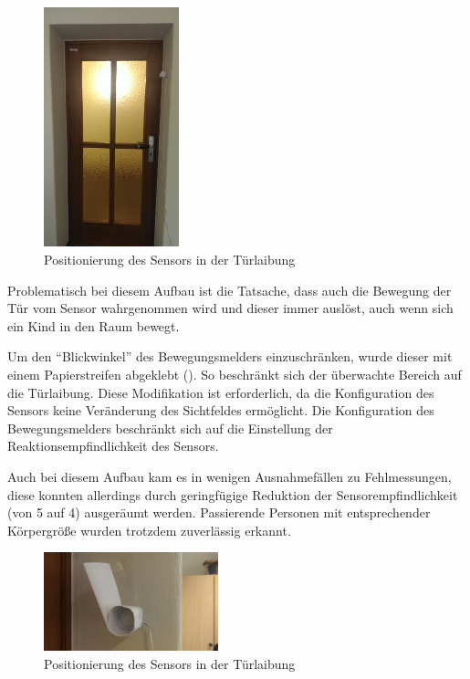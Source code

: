 \begin{figure}[h!]
	\centering
	\includegraphics[width=0.35\textwidth]{img/PersonIdentification/Aeotec1.jpg}
	\caption{Positionierung des Sensors in der Türlaibung}
	\label{fig:personIdentificationAeotec1}
\end{figure}

Problematisch bei diesem Aufbau ist die Tatsache, dass auch die Bewegung der Tür vom Sensor wahrgenommen wird und dieser immer auslöst, auch wenn sich ein Kind in den Raum bewegt.

Um den "`Blickwinkel"' des Bewegungsmelders einzuschränken, wurde dieser mit einem Papierstreifen abgeklebt (). So beschränkt sich der überwachte Bereich auf die Türlaibung. Diese Modifikation ist erforderlich, da die Konfiguration des Sensors keine Veränderung des Sichtfeldes ermöglicht. Die Konfiguration des Bewegungsmelders beschränkt sich auf die Einstellung der Reaktionsempfindlichkeit des Sensors.

Auch bei diesem Aufbau kam es in wenigen Ausnahmefällen zu Fehlmessungen, diese konnten allerdings durch geringfügige Reduktion der Sensorempfindlichkeit (von 5 auf 4) ausgeräumt werden. Passierende Personen mit entsprechender Körpergröße wurden trotzdem zuverlässig erkannt.

\begin{figure}[h!]
	\centering
	\includegraphics[width=0.45\textwidth]{img/PersonIdentification/Aeotec2.jpg}
	\caption{Positionierung des Sensors in der Türlaibung}
	\label{fig:personIdentificationAeotec2}
\end{figure}


